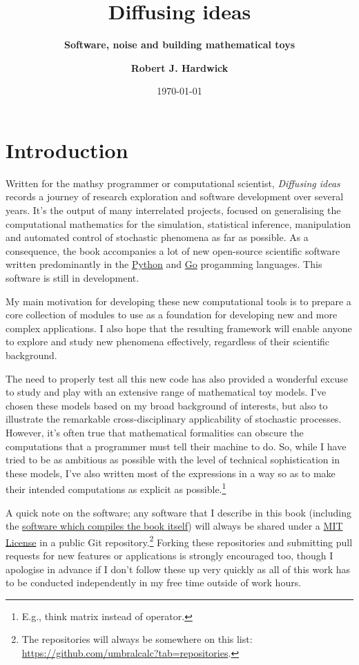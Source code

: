 \documentclass{book}
\title{\Huge \bfseries\sffamily Diffusing ideas}
\subtitle{\Large \bfseries\sffamily \color{gray75} Software, noise and building mathematical toys}
\author{\bfseries\sffamily Robert J. Hardwick}
\date{\today}
\begin{document}
\maketitle
\frontmatter

\chapter*{Introduction}

Written for the mathsy programmer or computational scientist, \emph{Diffusing ideas} records a journey of research exploration and software development over several years. It's the output of many interrelated projects, focused on generalising the computational mathematics for the simulation, statistical inference, manipulation and automated control of stochastic phenomena as far as possible. As a consequence, the book accompanies a lot of new open-source scientific software written predominantly in the \href{https://www.python.org/}{Python} and \href{https://go.dev/}{Go} progamming languages. This software is still in development. 

My main motivation for developing these new computational tools is to prepare a core collection of modules to use as a foundation for developing new and more complex applications. I also hope that the resulting framework will enable anyone to explore and study new phenomena effectively, regardless of their scientific background.

The need to properly test all this new code has also provided a wonderful excuse to study and play with an extensive range of mathematical toy models. I've chosen these models based on my broad background of interests, but also to illustrate the remarkable cross-disciplinary applicability of stochastic processes. However, it's often true that mathematical formalities can obscure the computations that a programmer must tell their machine to do. So, while I have tried to be as ambitious as possible with the level of technical sophistication in these models, I've also written most of the expressions in a way so as to make their intended computations as explicit as possible.\footnote{E.g., think matrix instead of operator.} 

A quick note on the software; any software that I describe in this book (including the \href{https://github.com/umbralcalc/diffusing-ideas}{software which compiles the book itself}) will always be shared under a \href{https://opensource.org/licenses/MIT}{MIT License} in a public Git repository.\footnote{The repositories will always be somewhere on this list: \href{https://github.com/umbralcalc?tab=repositories}{https://github.com/umbralcalc?tab=repositories}.} Forking these repositories and submitting pull requests for new features or applications is strongly encouraged too, though I apologise in advance if I don't follow these up very quickly as all of this work has to be conducted independently in my free time outside of work hours.
\end{document}
